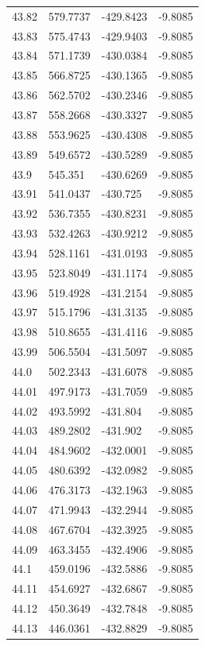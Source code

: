 \begin{table}[H]
\begin{tabular}{llll}
43.82 & 579.7737 & -429.8423 & -9.8085 \\
43.83 & 575.4743 & -429.9403 & -9.8085 \\
43.84 & 571.1739 & -430.0384 & -9.8085 \\
43.85 & 566.8725 & -430.1365 & -9.8085 \\
43.86 & 562.5702 & -430.2346 & -9.8085 \\
43.87 & 558.2668 & -430.3327 & -9.8085 \\
43.88 & 553.9625 & -430.4308 & -9.8085 \\
43.89 & 549.6572 & -430.5289 & -9.8085 \\
43.9 & 545.351 & -430.6269 & -9.8085 \\
43.91 & 541.0437 & -430.725 & -9.8085 \\
43.92 & 536.7355 & -430.8231 & -9.8085 \\
43.93 & 532.4263 & -430.9212 & -9.8085 \\
43.94 & 528.1161 & -431.0193 & -9.8085 \\
43.95 & 523.8049 & -431.1174 & -9.8085 \\
43.96 & 519.4928 & -431.2154 & -9.8085 \\
43.97 & 515.1796 & -431.3135 & -9.8085 \\
43.98 & 510.8655 & -431.4116 & -9.8085 \\
43.99 & 506.5504 & -431.5097 & -9.8085 \\
44.0 & 502.2343 & -431.6078 & -9.8085 \\
44.01 & 497.9173 & -431.7059 & -9.8085 \\
44.02 & 493.5992 & -431.804 & -9.8085 \\
44.03 & 489.2802 & -431.902 & -9.8085 \\
44.04 & 484.9602 & -432.0001 & -9.8085 \\
44.05 & 480.6392 & -432.0982 & -9.8085 \\
44.06 & 476.3173 & -432.1963 & -9.8085 \\
44.07 & 471.9943 & -432.2944 & -9.8085 \\
44.08 & 467.6704 & -432.3925 & -9.8085 \\
44.09 & 463.3455 & -432.4906 & -9.8085 \\
44.1 & 459.0196 & -432.5886 & -9.8085 \\
44.11 & 454.6927 & -432.6867 & -9.8085 \\
44.12 & 450.3649 & -432.7848 & -9.8085 \\
44.13 & 446.0361 & -432.8829 & -9.8085 \\

\end{tabular}
\end{table}
